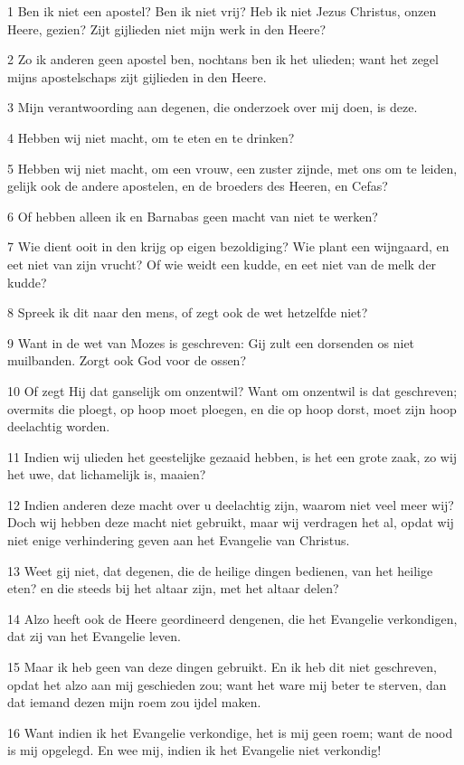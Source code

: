 \par 1 Ben ik niet een apostel? Ben ik niet vrij? Heb ik niet Jezus Christus, onzen Heere, gezien? Zijt gijlieden niet mijn werk in den Heere?
\par 2 Zo ik anderen geen apostel ben, nochtans ben ik het ulieden; want het zegel mijns apostelschaps zijt gijlieden in den Heere.
\par 3 Mijn verantwoording aan degenen, die onderzoek over mij doen, is deze.
\par 4 Hebben wij niet macht, om te eten en te drinken?
\par 5 Hebben wij niet macht, om een vrouw, een zuster zijnde, met ons om te leiden, gelijk ook de andere apostelen, en de broeders des Heeren, en Cefas?
\par 6 Of hebben alleen ik en Barnabas geen macht van niet te werken?
\par 7 Wie dient ooit in den krijg op eigen bezoldiging? Wie plant een wijngaard, en eet niet van zijn vrucht? Of wie weidt een kudde, en eet niet van de melk der kudde?
\par 8 Spreek ik dit naar den mens, of zegt ook de wet hetzelfde niet?
\par 9 Want in de wet van Mozes is geschreven: Gij zult een dorsenden os niet muilbanden. Zorgt ook God voor de ossen?
\par 10 Of zegt Hij dat ganselijk om onzentwil? Want om onzentwil is dat geschreven; overmits die ploegt, op hoop moet ploegen, en die op hoop dorst, moet zijn hoop deelachtig worden.
\par 11 Indien wij ulieden het geestelijke gezaaid hebben, is het een grote zaak, zo wij het uwe, dat lichamelijk is, maaien?
\par 12 Indien anderen deze macht over u deelachtig zijn, waarom niet veel meer wij? Doch wij hebben deze macht niet gebruikt, maar wij verdragen het al, opdat wij niet enige verhindering geven aan het Evangelie van Christus.
\par 13 Weet gij niet, dat degenen, die de heilige dingen bedienen, van het heilige eten? en die steeds bij het altaar zijn, met het altaar delen?
\par 14 Alzo heeft ook de Heere geordineerd dengenen, die het Evangelie verkondigen, dat zij van het Evangelie leven.
\par 15 Maar ik heb geen van deze dingen gebruikt. En ik heb dit niet geschreven, opdat het alzo aan mij geschieden zou; want het ware mij beter te sterven, dan dat iemand dezen mijn roem zou ijdel maken.
\par 16 Want indien ik het Evangelie verkondige, het is mij geen roem; want de nood is mij opgelegd. En wee mij, indien ik het Evangelie niet verkondig!
